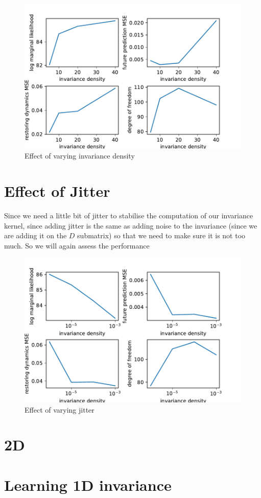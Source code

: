 \documentclass{statsmsc}
\begin{document}
\begin{figure}[H] 
  \includegraphics[width=0.6\linewidth]{../codes/figures/vary_invariance_density.pdf}
  \centering
  \caption{Effect of varying invariance density}
  \label{fig:vary_invariance_density}
\end{figure}

\section{Effect of Jitter}
Since we need a little bit of jitter to stabilise the computation of our invariance kernel, since adding jitter is the same as adding noise to the invariance (since we are adding it on the $D$ submatrix) so that we need to make sure it is not too much. So we will again assess the performance 

\begin{figure}[H] 
  \includegraphics[width=0.6\linewidth]{../codes/figures/vary_jitter_density.pdf}
  \centering
  \caption{Effect of varying jitter}
  \label{fig:vary_jitter}
\end{figure}

\section{2D}

\section{Learning 1D invariance}
\end{document}
